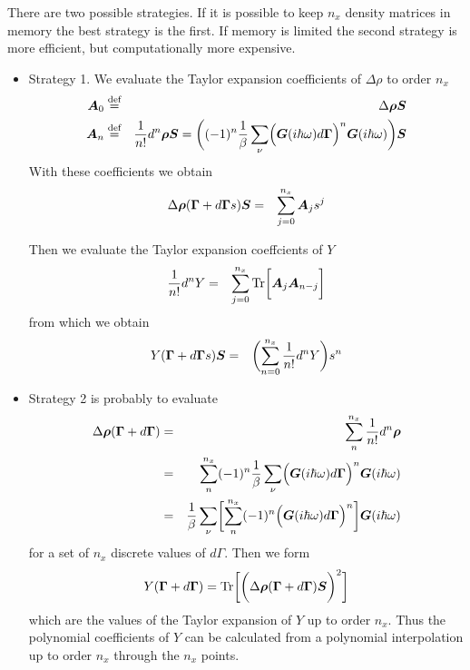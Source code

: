 \documentclass[11pt,a4paper]{report}
\begin{document}
There are two possible strategies. If it is possible to keep $n_x$
density matrices in memory the best strategy is the first. If memory
is limited the second strategy is more efficient, but computationally
more expensive.
\begin{itemize}
\item Strategy 1.  We evaluate the Taylor expansion coefficients of
  $\Delta\rho$ to order $n_x$
\begin{eqnarray}
\bm{A}_0&\stackrel{\text{def}}{=}&\Delta\bm{\rho}\bm{S}
\nonumber\\
\bm{A}_n&\stackrel{\text{def}}{=}&\frac{1}{n!}d^n\bm{\rho}\bm{S}
=
\biggl((-1)^n\frac{1}{\beta}\sum_\nu 
\Bigl(\bm{G}(i\hbar\omega)d\bm{\Gamma}\Bigr)^n\bm{G}(i\hbar\omega)\biggr)
\bm{S}
\end{eqnarray}
With these coefficients we obtain
\begin{eqnarray}
\Delta\bm{\rho}(\bm{\Gamma}+d\bm{\Gamma}s)\bm{S}
&=&\sum_{j=0}^{n_x}\bm{A}_js^j
\end{eqnarray}

Then we evaluate the Taylor expansion coeffcients of $Y$
\begin{eqnarray}
\frac{1}{n!}d^nY&=&\sum_{j=0}^{n_x}
\mathrm{Tr}\biggl[\bm{A}_j\bm{A}_{n-j}\biggr]
\end{eqnarray}
from which we obtain
\begin{eqnarray}
Y(\bm{\Gamma}+d\bm{\Gamma}s)\bm{S}
&=&\biggl(\sum_{n=0}^{n_x}\frac{1}{n!}d^nY\biggr) s^n
\end{eqnarray}

%
\item Strategy 2 is probably to evaluate
\begin{eqnarray}
\Delta\bm{\rho}(\bm{\Gamma}+d\bm{\Gamma})
&=&\sum_n^{n_x}\frac{1}{n!}d^n\bm{\rho}
\nonumber\\
&=&
\sum_n^{n_x}(-1)^n\frac{1}{\beta}\sum_\nu 
\Bigl(\bm{G}(i\hbar\omega)d\bm{\Gamma}\Bigr)^n\bm{G}(i\hbar\omega)
\nonumber\\
&=&
\frac{1}{\beta}\sum_\nu \biggl[\sum_n^{n_x}(-1)^n
\Bigl(\bm{G}(i\hbar\omega)d\bm{\Gamma}\Bigr)^n\biggr]
\bm{G}(i\hbar\omega)
\end{eqnarray}
for a set of $n_x$ discrete values of $d\Gamma$. Then we form
\begin{eqnarray}
Y(\bm{\Gamma}+d\bm{\Gamma})
=\mathrm{Tr}\biggl[\biggl(\Delta\bm{\rho}(\bm{\Gamma}
+d\bm{\Gamma})\bm{S}\biggr)^2\biggr]
\end{eqnarray}
which are the values of the Taylor expansion of $Y$ up to order
$n_x$.  Thus the polynomial coefficients of $Y$ can be calculated
from a polynomial interpolation up to order $n_x$ through the $n_x$
points.
\end{itemize}
\end{document}
